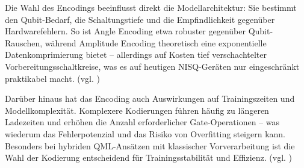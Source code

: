 Die Wahl des Encodings beeinflusst direkt die Modellarchitektur: Sie bestimmt den Qubit-Bedarf, die Schaltungstiefe und die Empfindlichkeit gegenüber Hardwarefehlern. So ist Angle Encoding etwa robuster gegenüber Qubit-Rauschen, während Amplitude Encoding theoretisch eine exponentielle Datenkomprimierung bietet – allerdings auf Kosten tief verschachtelter Vorbereitungsschaltkreise, was es auf heutigen NISQ-Geräten nur eingeschränkt praktikabel macht. (vgl. \cite{schuld_supervised_2018})

Darüber hinaus hat das Encoding auch Auswirkungen auf Trainingszeiten und Modellkomplexität. Komplexere Kodierungen führen häufig zu längeren Ladezeiten und erhöhen die Anzahl erforderlicher Gate-Operationen – was wiederum das Fehlerpotenzial und das Risiko von Overfitting steigern kann. Besonders bei hybriden QML-Ansätzen mit klassischer Vorverarbeitung ist die Wahl der Kodierung entscheidend für Trainingsstabilität und Effizienz. (vgl. \cite{schuld_supervised_2018})


